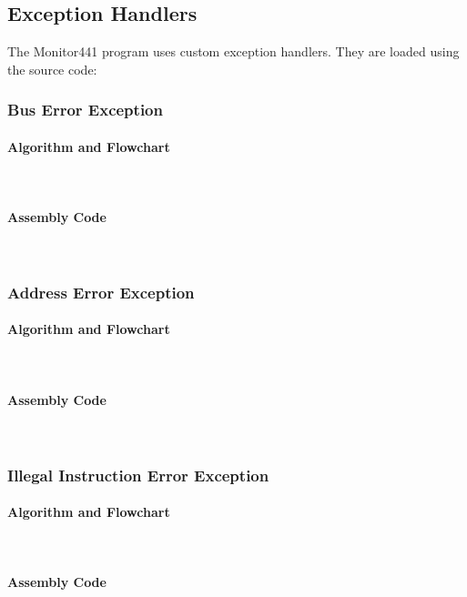 \documentclass[12pt]{article}
\begin{document}
			\subsection{Exception Handlers}
			The Monitor441 program uses custom exception handlers. They are loaded using the source code:
			\subsubsection{Bus Error Exception}
			\paragraph{Algorithm and Flowchart}~\\
			\paragraph{Assembly Code}~\\				
			
			\subsubsection{Address Error Exception}
			\paragraph{Algorithm and Flowchart}~\\
			\paragraph{Assembly Code}~\\			
			
			\subsubsection{Illegal Instruction Error Exception}
			\paragraph{Algorithm and Flowchart}~\\
			\paragraph{Assembly Code}~\\	
			
\end{document}
